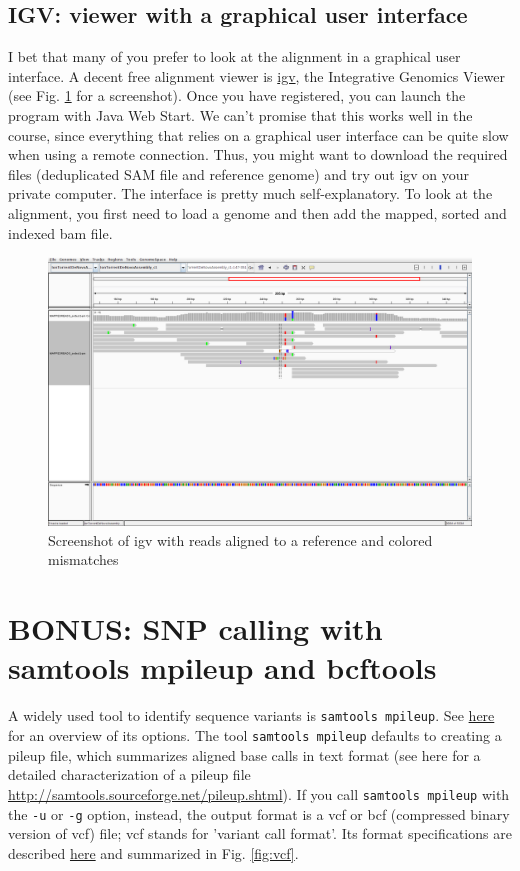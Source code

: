 \documentclass[11pt]{article}
\begin{document}
\subsection{IGV: viewer with a graphical user interface}
\label{sec-3-2}
I bet that many of you prefer to look at the alignment in a graphical
user interface. A decent free alignment viewer is \href{https://www.broadinstitute.org/igv/}{igv}, the Integrative
Genomics Viewer (see Fig. \ref{fig:igv} for a screenshot). Once you have
registered, you can launch the program with Java Web Start. We can't
promise that this works well in the course, since everything that
relies on a graphical user interface can be quite slow when using a
remote connection. Thus, you might want to download the required files
(deduplicated SAM file and reference genome) and try out igv on your
private computer. The interface is pretty much self-explanatory. To
look at the alignment, you first need to load a genome and then add
the mapped, sorted and indexed bam file.



\begin{figure}[htb]
\centering
\includegraphics[width=17cm]{igv.png}
\caption{\label{fig:igv}Screenshot of igv with reads aligned to a reference and colored mismatches}
\end{figure}

\clearpage
\section{BONUS: SNP calling with samtools mpileup and bcftools}
\label{sec-4}
A widely used tool to identify sequence variants is \texttt{samtools
mpileup}. See \href{http://samtools.sourceforge.net/samtools.shtml}{here} for an overview of its options. The tool \texttt{samtools
mpileup} defaults to creating a pileup file, which summarizes aligned
base calls in text format (see here for a detailed characterization of
a pileup file \url{http://samtools.sourceforge.net/pileup.shtml}). If you
call \texttt{samtools mpileup} with the \texttt{-u} or \texttt{-g} option, instead, the
output format is a vcf or bcf (compressed binary version of vcf) file;
vcf stands for 'variant call format'. Its format specifications are
described \href{https://samtools.github.io/hts-specs/VCFv4.2.pdf}{here} and summarized in Fig. \ref{fig:vcf}.
\end{document}
